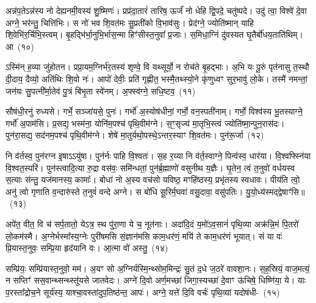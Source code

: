 {\anuvakamend[{तृ॒तीये᳚ त्वा॒ गर्भ॒ आ य॑वि॒ष्ठा यच्च॒त्वारि॑ च}]}%

अन्न॑प॒ते\-ऽन्न॑स्य नो देह्यनमी॒वस्य॑ शु॒ष्मिणः॑। प्रप्र॑दा॒तारं॑ तारिष॒ ऊर्जं॑ नो धेहि द्वि॒पदे॒ चतु॑ष्पदे। उदु॑ त्वा॒ विश्वे॑ दे॒वा अग्ने॒ भर॑न्तु॒ चित्ति॑भिः। स नो॑ भव शि॒वत॑मः सु॒प्रती॑को वि॒भाव॑सुः। प्रेद॑ग्ने॒ ज्योति॑ष्मान् याहि शि॒वेभि॑र॒र्चिभि॒स्त्वम्। बृ॒हद्भि॑र्भा॒नुभि॒र्भास॒न्मा हिꣳ॑सीस्त॒नुवा᳚ प्र॒जाः। स॒मिधा॒ग्निं दु॑वस्यत घृ॒तैर्बो॑धय॒ताति॑थिम्। आ~(१०)

ऽस्मि॑न् ह॒व्या जु॑होतन। प्रप्रा॒यम॒ग्निर्भ॑र॒तस्य॑ शृण्वे॒ वि यथ्सूर्यो॒ न रोच॑ते बृ॒हद्भाः। अ॒भि यः पू॒रुं पृत॑नासु त॒स्थौ दी॒दाय॒ दैव्यो॒ अति॑थिः शि॒वो नः॑। आपो॑ देवीः॒ प्रति॑ गृह्णीत॒ भस्मै॒तथ्स्यो॒ने कृ॑णुध्वꣳ सुर॒भावु॑ लो॒के। तस्मै॑ नमन्तां॒ जन॑यः सु॒पत्नी᳚र्मा॒तेव॑ पु॒त्रं बि॑भृ॒ता स्वे॑नम्। अ॒फ्स्व॑ग्ने॒ सधि॒ष्टव॒~(११)

सौष॑धी॒रनु॑ रुध्यसे। गर्भे॒ सञ्जा॑यसे॒ पुनः॑। गर्भो॑ अ॒स्योष॑धीनां॒ गर्भो॒ वन॒स्पती॑नाम्। गर्भो॒ विश्व॑स्य भू॒तस्याग्ने॒ गर्भो॑ अ॒पाम॑सि। प्र॒सद्य॒ भस्म॑ना॒ योनि॑म॒पश्च॑ पृथि॒वीम॑ग्ने। स॒ꣳ॒सृज्य॑ मा॒तृभि॒स्त्वं ज्योति॑ष्मा॒न्पुन॒रास॑दः। पुन॑रा॒सद्य॒ सद॑नम॒पश्च॑ पृथि॒वीम॑ग्ने। शेषे॑ मा॒तुर्यथो॒पस्थे॒\-ऽन्तर॒स्याꣳ शि॒वत॑मः। पुन॑रू॒र्जा~(१२)

नि व॑र्तस्व॒ पुन॑रग्न इ॒षा\-ऽ\-ऽ\-यु॑षा। पुन॑र्नः पाहि वि॒श्वतः॑। स॒ह र॒य्या नि व॑र्त॒स्वाग्ने॒ पिन्व॑स्व॒ धार॑या। वि॒श्वफ्स्नि॑या वि॒श्वत॒स्परि॑। पुन॑स्त्वादि॒त्या रु॒द्रा वस॑वः॒ समि॑न्धतां॒ पुन॑र्ब्र॒ह्माणो॑ वसुनीथ य॒ज्ञैः। घृ॒तेन॒ त्वं त॒नुवो॑ वर्धयस्व स॒त्याः स॑न्तु॒ यज॑मानस्य॒ कामाः᳚। बोधा॑ नो अ॒स्य वच॑सो यविष्ठ॒ मꣳहि॑ष्ठस्य॒ प्रभृ॑तस्य स्वधावः। पीय॑ति त्वो॒ अनु॑ त्वो गृणाति व॒न्दारु॑स्ते त॒नुवं॑ वन्दे अग्ने। स बो॑धि सू॒रिर्म॒घवा॑ वसु॒दावा॒ वसु॑पतिः। यु॒यो॒ध्य॑स्मद्द्वेषाꣳ॑सि॥~(१३)

{\anuvakamend[{आ तवो॒र्जा\-ऽनु॒ षोड॑श च}]}%

अपे॑त॒ वीत॒ वि च॑ सर्प॒तातो॒ ये\-ऽत्र॒ स्थ पु॑रा॒णा ये च॒ नूत॑नाः। अदा॑दि॒दं य॒मो॑\-ऽव॒सानं॑ पृथि॒व्या अक्र॑न्नि॒मं पि॒तरो॑ लो॒कम॑स्मै। अ॒ग्नेर्भस्मा᳚स्य॒ग्नेः पुरी॑षमसि सं॒ज्ञान॑मसि काम॒धर॑णं॒ मयि॑ ते काम॒धर॑णं भूयात्। सं या वः॑ प्रि॒यास्त॒नुवः॒ सम्प्रि॒या हृद॑यानि वः। आ॒त्मा वो॑ अस्तु॒~(१४)

सम्प्रि॑यः॒ सम्प्रि॑यास्त॒नुवो॒ मम॑। अ॒यꣳ सो अ॒ग्निर्यस्मि॒न्थ्सोम॒\-मिन्द्रः॑ सु॒तं द॒धे ज॒ठरे॑ वावशा॒नः। स॒ह॒स्रियं॒ वाज॒मत्यं॒ न सप्तिꣳ॑ सस॒वान्थ्सन्थ्स्तू॑यसे जातवेदः। अग्ने॑ दि॒वो अर्ण॒मच्छा॑ जिगा॒स्यच्छा॑ दे॒वाꣳ ऊ॑चिषे॒ धिष्णि॑या॒ ये। याः प॒रस्ता᳚द्रोच॒ने सूर्य॑स्य॒ याश्चा॒वस्ता॑दुप॒तिष्ठ॑न्त॒ आपः॑। अग्ने॒ यत्ते॑ दि॒वि वर्चः॑ पृथि॒व्यां यदोष॑धी-~(१५)

